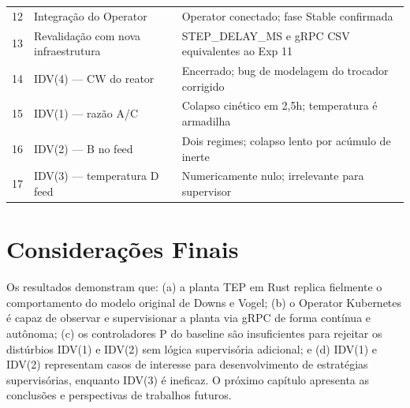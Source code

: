 \begin{table}[ht!]
\begin{tabular}{|c|l|l|}
12 & Integração do Operator                 & Operator conectado; fase Stable confirmada             \\
13 & Revalidação com nova infraestrutura    & STEP\_DELAY\_MS e gRPC CSV equivalentes ao Exp 11      \\
14 & IDV(4) — CW do reator                  & Encerrado; bug de modelagem do trocador corrigido      \\
15 & IDV(1) — razão A/C                     & Colapso cinético em 2,5h; temperatura é armadilha      \\
16 & IDV(2) — B no feed                     & Dois regimes; colapso lento por acúmulo de inerte      \\
17 & IDV(3) — temperatura D feed            & Numericamente nulo; irrelevante para supervisor        \\
\hline
\end{tabular}
\end{table}

\section{Considerações Finais}
\label{sec:res_conclusao}

Os resultados demonstram que: (a) a planta TEP em Rust replica fielmente o comportamento do modelo original de Downs e Vogel; (b) o Operator Kubernetes é capaz de observar e supervisionar a planta via gRPC de forma contínua e autônoma; (c) os controladores P do baseline são insuficientes para rejeitar os distúrbios IDV(1) e IDV(2) sem lógica supervisória adicional; e (d) IDV(1) e IDV(2) representam casos de interesse para desenvolvimento de estratégias supervisórias, enquanto IDV(3) é ineficaz. O próximo capítulo apresenta as conclusões e perspectivas de trabalhos futuros.
